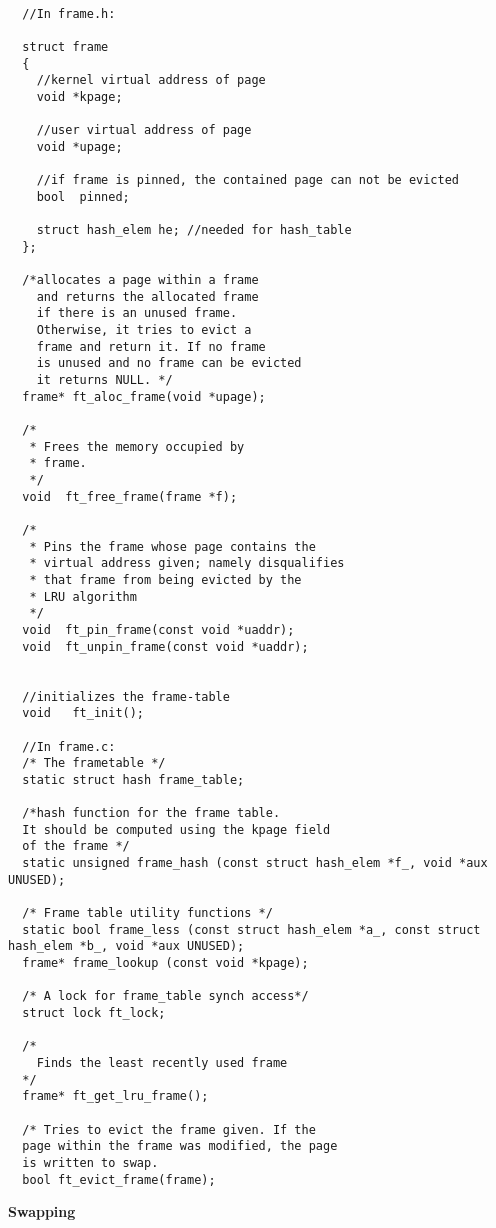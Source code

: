 \begin{lstlisting}

  //In frame.h:

  struct frame
  {
	//kernel virtual address of page
	void *kpage; 	
	  
	//user virtual address of page
	void *upage;	
	
	//if frame is pinned, the contained page can not be evicted
	bool  pinned;		
	
	struct hash_elem he; //needed for hash_table
  };

  /*allocates a page within a frame
    and returns the allocated frame
    if there is an unused frame.
    Otherwise, it tries to evict a 
    frame and return it. If no frame
    is unused and no frame can be evicted
    it returns NULL. */
  frame* ft_aloc_frame(void *upage);

  /*
   * Frees the memory occupied by
   * frame.
   */
  void 	ft_free_frame(frame *f);  

  /*
   * Pins the frame whose page contains the
   * virtual address given; namely disqualifies 
   * that frame from being evicted by the 
   * LRU algorithm
   */
  void 	ft_pin_frame(const void *uaddr);
  void 	ft_unpin_frame(const void *uaddr);


  //initializes the frame-table
  void	 ft_init();

  //In frame.c:
  /* The frametable */
  static struct hash frame_table;

  /*hash function for the frame table.
  It should be computed using the kpage field
  of the frame */
  static unsigned frame_hash (const struct hash_elem *f_, void *aux UNUSED);
  
  /* Frame table utility functions */
  static bool frame_less (const struct hash_elem *a_, const struct hash_elem *b_, void *aux UNUSED);
  frame* frame_lookup (const void *kpage);

  /* A lock for frame_table synch access*/
  struct lock ft_lock;

  /*
    Finds the least recently used frame
  */
  frame* ft_get_lru_frame();
  
  /* Tries to evict the frame given. If the 
  page within the frame was modified, the page
  is written to swap. 
  bool ft_evict_frame(frame);

\end{lstlisting}

\textbf{Swapping}

